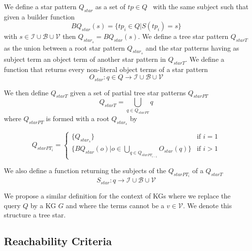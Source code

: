 \begin{definition}\label{def:starPattern}
    We define a star pattern $Q_{star}$ as a set of $tp \in Q$~\cite{Karim2020} with the same subject such that 
    given a builder function 
    \begin{equation}
        BQ_{star}(s) = \{tp_i \in Q| S(tp_i) = s\}
    \end{equation}
    with $s \in \mathcal{I} \cup \mathcal{B} \cup \mathcal{V}$ then $Q_{star_s} = BQ_{star}(s)$.
    We define a tree star pattern $Q_{starT}$ as the union between a root star pattern $Q_{star_s}$
    and the star patterns having as subject term an object term of another star pattern in $Q_{starT}$.
    We define a function that returns every non-literal object terms of a star pattern
    \begin{equation}
        O_{star}: q \in Q \rightarrow  \mathcal{I} \cup \mathcal{B} \cup \mathcal{V}
    \end{equation}

    We then define $Q_{starT}$ given a  set of partial tree star patterns $Q_{starPT}$
    \begin{equation}
        Q_{starT} = \bigcup_{q \in Q_{starPT}} q
    \end{equation}
    where $Q_{starPT}$ is formed with a root $Q_{star_s}$ by

    \begin{equation}
            Q_{starPT_i} =
        \begin{cases}
            \{Q_{star_s}\} & \text{if } i = 1 \\
            \{BQ_{star}(o)| o \in \bigcup\limits_{q \in Q_{starPT_{i-1}}} O_{star}(q)\} & \text{if } i>1
        \end{cases}
    \end{equation}

    We also define a function returning the subjects of the $Q_{starPT_i}$ of a $Q_{starT}$
    \begin{equation}
        S_{star}: q \rightarrow  \mathcal{I} \cup \mathcal{B} \cup \mathcal{V}
    \end{equation}

    We propose a similar definition for the context of KGs where we replace the query $Q$ by a KG $G$ and where the terms 
    cannot be a $v \in \mathcal{V}$. 
    We denote this structure a tree star.

\end{definition}

\subsection{Reachability Criteria}

